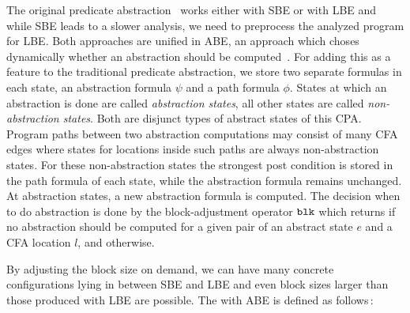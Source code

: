 The original predicate abstraction~\cite{Beyer:PredicateAbstraction} works either with \ac{SBE} or with
\ac{LBE} and while \ac{SBE} leads to a slower analysis, we need to preprocess the analyzed program for
\ac{LBE}. Both approaches are unified in \ac{ABE}, an approach which choses dynamically whether an abstraction
should be computed~\cite{Beyer:PredicateAbstraction}. For adding this as a feature to the traditional
predicate abstraction, we store two separate formulas in each state, an abstraction formula $\psi$ and a
path formula $\phi$. States at which an abstraction is done are called \emph{abstraction states}, all other
states are called \emph{non-abstraction states}. Both are disjunct types of abstract states of this \ac{CPA}.
Program paths between two abstraction computations may consist of many \ac{CFA} edges where states for
locations inside such paths are always non-abstraction states. For these non-abstraction states the strongest
post condition is stored in the path formula of each state, while the abstraction formula remains unchanged.
At abstraction states, a new abstraction formula is computed. The decision when to do abstraction is done by
the block-adjustment operator $\mathtt{blk}{}$ which returns \false{} if no abstraction should be computed for a given
pair of an abstract state $e$ and a \ac{CFA} location $l$, and \true{} otherwise. 

By adjusting the block size on demand, we can have many concrete configurations lying in between \ac{SBE} and
\ac{LBE} and even block sizes larger than those produced with \ac{LBE} are possible.
The \PredicateCPA{} with \ac{ABE} is defined as follows\,:

